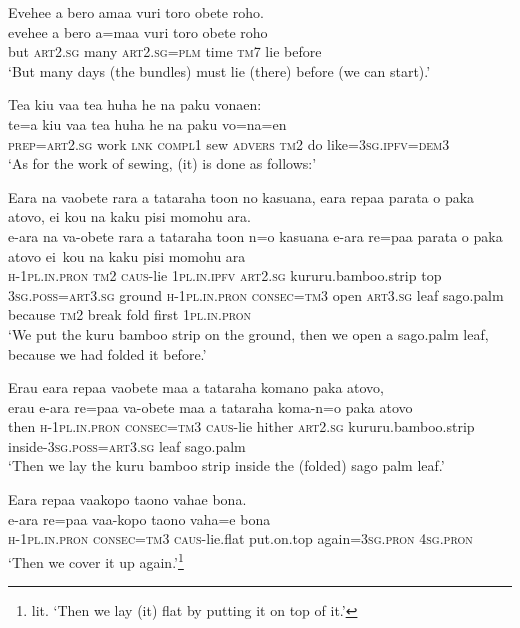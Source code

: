 \ea\label{ex:text12-21}
Evehee a bero amaa vuri toro obete roho.\\
\gll evehee	a	bero	a=maa	vuri	toro	obete	roho\\
     but	\textsc{art}2.\textsc{sg}	many	\textsc{art}2.\textsc{sg}=\textsc{plm}	time	\textsc{tm}7	lie	before\\
\glt `But many days (the bundles) must lie (there) before (we can start).'
\z

\ea\label{ex:text12-22}
Tea kiu vaa tea huha he na paku vonaen:\\
\gll te=a	kiu	vaa	tea	huha	he	na	paku	vo=na=en\\
     \textsc{prep}=\textsc{art}2.\textsc{sg}	work	\textsc{lnk}	\textsc{compl}1	sew	\textsc{advers}	\textsc{tm}2	do	like=3\textsc{sg}.\textsc{ipfv}=\textsc{dem}3\\
\glt `As for the work of sewing, (it) is done as follows:'
\z

\newpage
\ea\label{ex:text12-23}
Eara na vaobete rara a tataraha toon no kasuana, eara repaa parata o paka atovo, ei kou na kaku pisi momohu ara.\\
\gll e-ara	na	va-obete	rara	a	tataraha	toon	n=o	kasuana	e-ara	re=paa	parata	o	paka	atovo	ei~kou	na	kaku	pisi	momohu	ara\\
     \textsc{h}-1\textsc{pl}.\textsc{in}.\textsc{pron}	\textsc{tm}2	\textsc{caus}-lie	1\textsc{pl}.\textsc{in}.\textsc{ipfv}	\textsc{art}2.\textsc{sg}	kururu.bamboo.strip	top	3\textsc{sg}.\textsc{poss}=\textsc{art}3.\textsc{sg}	ground	\textsc{h}-1\textsc{pl}.\textsc{in}.\textsc{pron}	\textsc{consec}=\textsc{tm}3	open	\textsc{art}3.\textsc{sg}	leaf	sago.palm	because	\textsc{tm}2	break	fold	first	1\textsc{pl}.\textsc{in}.\textsc{pron}\\
\glt `We put the kuru bamboo strip on the ground, then we open a sago.palm leaf, because we had folded it before.'
\z

\ea\label{ex:text12-24}
Erau eara repaa vaobete maa a tataraha komano paka atovo,\\
\gll erau	e-ara	re=paa	va-obete	maa	a	tataraha	koma-n=o	paka	atovo\\
     then	\textsc{h}-1\textsc{pl}.\textsc{in}.\textsc{pron}	\textsc{consec}=\textsc{tm}3	\textsc{caus}-lie	hither	\textsc{art}2.\textsc{sg}	kururu.bamboo.strip	inside-3\textsc{sg}.\textsc{poss}=\textsc{art}3.\textsc{sg}	leaf	sago.palm\\
\glt `Then we lay the kuru bamboo strip inside the (folded) sago palm leaf.'
\z

\ea\label{ex:text12-25}
Eara repaa vaakopo taono vahae bona.\\
\gll e-ara	re=paa	vaa-kopo	taono	vaha=e	bona\\
     \textsc{h}-1\textsc{pl}.\textsc{in}.\textsc{pron}	\textsc{consec}=\textsc{tm}3	\textsc{caus}-lie.flat	put.on.top	again=3\textsc{sg}.\textsc{pron}	4\textsc{sg}.\textsc{pron}\\
\glt `Then we cover it up again.'\footnote{lit. `Then we lay (it) flat by putting it on top of it.'}
\z

